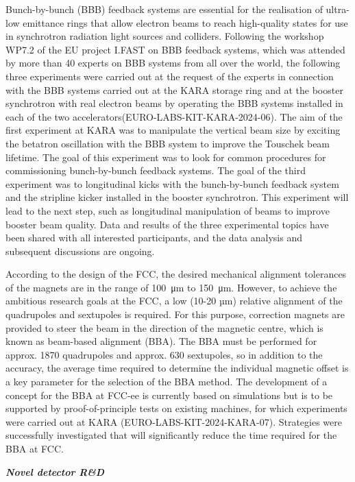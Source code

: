 Bunch-by-bunch (BBB) feedback systems are essential for the realisation of ultra-low emittance rings that allow electron beams to reach high-quality states for use in synchrotron radiation light sources and colliders. Following the workshop WP7.2 of the EU project I.FAST on BBB feedback systems, which was attended by more than 40 experts on BBB systems from all over the world, the following three experiments were carried out at the request of the experts in connection with the BBB systems carried out at the KARA storage ring and at the booster synchrotron with real electron beams by operating the BBB systems installed in each of the two accelerators(EURO-LABS-KIT-KARA-2024-06). The aim of the first experiment at KARA was to manipulate the vertical beam size by exciting the betatron oscillation with the BBB system to improve the Touschek beam lifetime. The goal of this experiment was to look for common procedures for commissioning bunch-by-bunch feedback systems. The goal of the third experiment was to longitudinal kicks with the bunch-by-bunch feedback system and the stripline kicker installed in the booster synchrotron. This experiment will lead to the next step, such as longitudinal manipulation of beams to improve booster beam quality. Data and results of the three experimental topics have been shared with all interested participants, and the data analysis and subsequent discussions are ongoing. 


According to the design of the FCC, the desired mechanical alignment tolerances of the magnets are in the range of \SI{100}{\micro\meter} to \SI{150}{\micro\meter}. However, to achieve the ambitious research goals at the FCC, a low (10-20 µm) relative alignment of the quadrupoles and sextupoles is required. For this purpose, correction magnets are provided to steer the beam in the direction of the magnetic centre, which is known as beam-based alignment (BBA). The BBA must be performed for approx. 1870 quadrupoles and approx. 630 sextupoles, so in addition to the accuracy, the average time required to determine the individual magnetic offset is a key parameter for the selection of the BBA method. The development of a concept for the BBA at FCC-ee is currently based on simulations but is to be supported by proof-of-principle tests on existing machines, for which experiments were carried out at KARA (EURO-LABS-KIT-2024-KARA-07).  Strategies were successfully investigated that will significantly reduce the time required for the BBA at FCC.


\textbf{\textit{Novel detector R\&D}} \mbox{}

